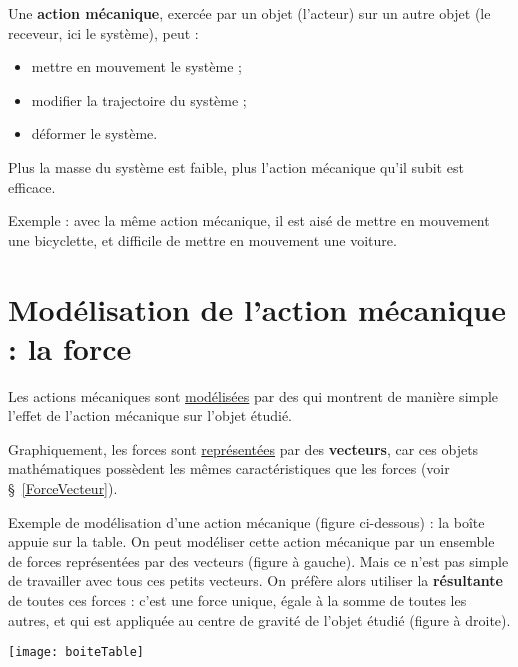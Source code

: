 \begin{aconnaitre}
Une \textbf{action mécanique}, exercée par un objet (l'acteur) sur un autre objet (le receveur, ici le système), peut :
\begin{itemize}
\item mettre en mouvement le système ;
\item modifier la trajectoire du système ;
\item déformer le système.
\end{itemize}

\vspace{.5em}

Plus la masse du système est faible, plus l'action mécanique qu'il subit est efficace.
\end{aconnaitre}

\vspace{1em}

Exemple : avec la même action mécanique, il est aisé de mettre en mouvement une bicyclette, et difficile de mettre en mouvement une voiture.

\section{Modélisation de l'action mécanique : la force}

Les actions mécaniques sont \underline{modélisées} par des \textbf{} qui montrent de manière simple l'effet de l'action mécanique sur l'objet étudié.

Graphiquement, les forces sont \underline{représentées} par des \textbf{vecteurs}, car ces objets mathématiques possèdent les mêmes caractéristiques que les forces (voir \S\ \ref{ForceVecteur}). 

\vspace{1em}

Exemple de modélisation d'une action mécanique (figure ci-dessous) : la boîte appuie sur la table. On peut modéliser cette action mécanique par un ensemble de forces représentées par des vecteurs (figure à gauche). Mais ce n'est pas simple de travailler avec tous ces petits vecteurs. On préfère alors utiliser la \textbf{résultante} de toutes ces forces : c'est une force unique, égale à la somme de toutes les autres, et qui est appliquée au centre de gravité de l'objet étudié (figure à droite).


\begin{center}
    \texttt{[image: boiteTable]}
\end{center}


